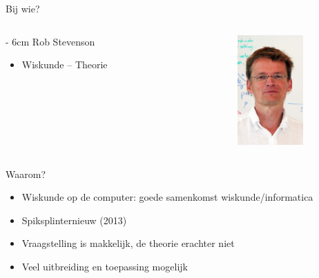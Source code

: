 \documentclass{beamer}
\begin{document}
\begin{frame}{Bij wie?}
  \begin{columns}[t]
    \begin{column}[T]{\linewidth - 6cm}
      Rob Stevenson
      \begin{itemize}
        \item Wiskunde -- Theorie
      \end{itemize}
      ~~\\
    \end{column}
    \begin{column}[T]{3cm}
    \end{column}
    \begin{column}[T]{3cm}
      \includegraphics[width=2.5cm]{Stevenson.jpg}
    \end{column}
  \end{columns}
\end{frame}

\begin{frame}{Waarom?}
  \begin{itemize}
    \item Wiskunde op de computer: goede samenkomst wiskunde/informatica \pause
    \item Spiksplinternieuw (2013) \pause
    \item Vraagstelling is makkelijk, de theorie erachter niet \pause
    \item Veel uitbreiding en toepassing mogelijk
  \end{itemize}
\end{frame}
\end{document}
